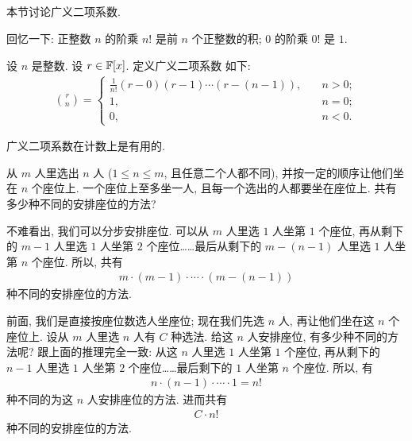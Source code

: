\subsection*{\GeneralizedBinomialCoefficients}
\markright{\GeneralizedBinomialCoefficients}

本节讨论广义二项系数.

回忆一下: 正整数 $n$ 的阶乘 $n!$ 是前 $n$ 个正整数的积; $0$ 的阶乘 $0!$ 是 $1$.

\begin{definition}
    设 $n$ 是整数. 设 $r \in \mathbb{F}[x]$. 定义广义二项系数  如下:
    \begin{align*}
        \binom{r}{n} = \begin{cases}
            \frac{1}{n!} (r - 0)(r - 1) \cdots (r - (n - 1)), & \quad n > 0; \\
            1,                                                & \quad n = 0; \\
            0,                                                & \quad n < 0.
        \end{cases}
    \end{align*}
\end{definition}

广义二项系数在计数上是有用的.

从 $m$ 人里选出 $n$ 人 ($1 \leq n \leq m$, 且任意二个人都不同), 并按一定的顺序让他们坐在 $n$ 个座位上. 一个座位上至多坐一人, 且每一个选出的人都要坐在座位上. 共有多少种不同的安排座位的方法?

不难看出, 我们可以分步安排座位. 可以从 $m$ 人里选 $1$ 人坐第 $1$ 个座位, 再从剩下的 $m-1$ 人里选 $1$ 人坐第 $2$ 个座位……最后从剩下的 $m - (n - 1)$ 人里选 $1$ 人坐第 $n$ 个座位. 所以, 共有
\begin{align*}
    m \cdot (m-1) \cdot \cdots \cdot (m - (n - 1))
\end{align*}
种不同的安排座位的方法.

前面, 我们是直接按座位数选人坐座位; 现在我们先选 $n$ 人, 再让他们坐在这 $n$ 个座位上. 设从 $m$ 人里选 $n$ 人有 $C$ 种选法. 给这 $n$ 人安排座位, 有多少种不同的方法呢? 跟上面的推理完全一致: 从这 $n$ 人里选 $1$ 人坐第 $1$ 个座位, 再从剩下的 $n-1$ 人里选 $1$ 人坐第 $2$ 个座位……最后剩下的 $1$ 人坐第 $n$ 个座位. 所以, 有
\begin{align*}
    n \cdot (n - 1) \cdot \cdots \cdot 1 = n!
\end{align*}
种不同的为这 $n$ 人安排座位的方法. 进而共有
\begin{align*}
    C \cdot n!
\end{align*}
种不同的安排座位的方法.

